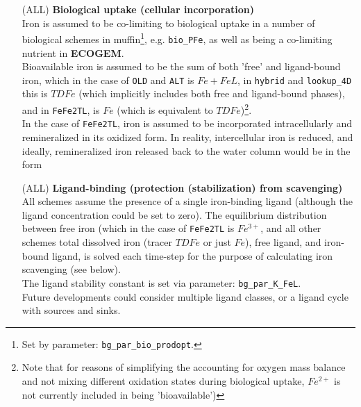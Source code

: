 \begin{itemize}[noitemsep]

\vspace{1mm}
\item [(ALL)] \textbf{Biological uptake (cellular incorporation)}
\\Iron is assumed to be co-limiting to biological uptake in a number of biological schemes in muffin\footnote{Set by parameter: \texttt{bg\_par\_bio\_prodopt}.}, e.g. \texttt{bio\_PFe}, as well as being a co-limiting nutrient in \textbf{ECOGEM}.
\\Bioavailable iron is assumed to be the sum of both 'free' and ligand-bound iron, which in the case of  \texttt{OLD} and \texttt{ALT} is \(Fe+FeL\), in \texttt{hybrid} and \texttt{lookup\_4D} this is \(TDFe\) (which implicitly includes both free and ligand-bound phases), and in \texttt{FeFe2TL}, is \(Fe\) (which is equivalent to \(TDFe\))\footnote{Note that for reasons of simplifying the accounting for oxygen mass balance and not mixing different oxidation states during biological uptake, \(Fe^{2+}\) is not currently included in being 'bioavailable')}.
\\In the case of \texttt{FeFe2TL}, iron is assumed to be incorporated  intracellularly and remineralized in its oxidized form. In reality, intercellular iron is reduced, and ideally, remineralized iron released back to the water column would be in the form

\vspace{1mm}
\item [(ALL)] \textbf{Ligand-binding (protection (stabilization) from scavenging)}
\\All schemes assume the presence of a single iron-binding ligand (although the ligand concentration could be set to zero). The equilibrium distribution between free iron (which in the case of \texttt{FeFe2TL} is \(Fe^{3+}\), and all other schemes total dissolved iron (tracer \(TDFe\) or just \(Fe\)), free ligand, and iron-bound ligand, is solved each time-step for the purpose of calculating iron scavenging (see below).
\\The ligand stability constant is set via parameter: \texttt{bg\_par\_K\_FeL}.
\\Future developments could consider multiple ligand classes, or a ligand cycle with sources and sinks.


\end{itemize}
